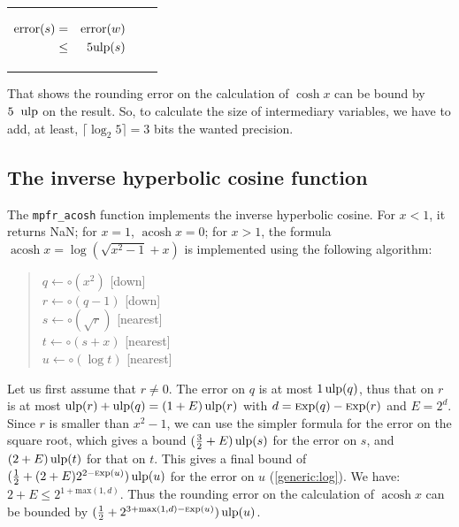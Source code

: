 \documentclass[12pt]{amsart}
\DeclareMathOperator{\acosh}{acosh}
\def\ulp{{\rm ulp}}
\def\Exp{{\rm \textsc exp}}
\begin{document}
\begin{center}
\begin{tabular}{l l l}
\begin{minipage}{7.5cm}
\begin{center}


\begin{eqnarray}\nonumber
 {\textnormal{error}}(s) & = &  {\textnormal{error}}(w)\\\nonumber
 & \leq &  5\ulp(s)
\end{eqnarray}



\end{center}

\end{minipage} &
\begin{minipage}{6cm}


\end{minipage}


\end{tabular}
\end{center}

That shows the rounding error on the calculation of $\cosh x$ can be
bound by $5 \;\; \ulp$ on the result. So, to calculate the size of
intermediary variables, we have to add, at least, $\lceil \log_2 5 \rceil=3$ bits the wanted
precision.

\subsection{The inverse hyperbolic cosine function}

The {\tt mpfr\_acosh} function implements the inverse hyperbolic
cosine. For $x < 1$, it returns NaN; for $x=1$, $\acosh x = 0$;
for $x > 1$, the formula $\acosh x = \log ( \sqrt{x^2-1} + x )$
is implemented using the following algorithm:
\begin{quote}
$q \leftarrow \circ(x^2)$ [down] \\
$r \leftarrow \circ(q-1)$ [down] \\
$s \leftarrow \circ(\sqrt{r})$ [nearest] \\
$t \leftarrow \circ(s + x)$ [nearest] \\
$u \leftarrow \circ(\log t)$ [nearest]
\end{quote}

Let us first assume that $r \ne 0$. The error on $q$ is at most $1\,\ulp(q)$,
thus that on $r$ is at most $\ulp(r) + \ulp(q) = (1+E)\,\ulp(r)$ with
$d = \Exp(q) - \Exp(r)$ and $E = 2^d$.
Since $r$ is smaller than $x^2-1$, we can use the simpler formula for the
error on the square root, which gives a bound $(\frac{3}{2} + E)\,\ulp(s)$
for the error on $s$, and $(2 + E)\,\ulp(t)$ for that on $t$. This gives
a final bound of $(\frac{1}{2} + (2 + E) 2^{2-\Exp(u)})\,\ulp(u)$ for the
error on $u$ (\textsection\ref{generic:log}).
We have: $2 + E \leq 2^{1 + \mathrm{max}(1,d)}$. Thus the rounding error
on the calculation of $\acosh x$ can be bounded by
$(\frac{1}{2} + 2^{3 + \mathrm{max}(1,d) - \Exp(u)})\,\ulp(u)$.
\end{document}
